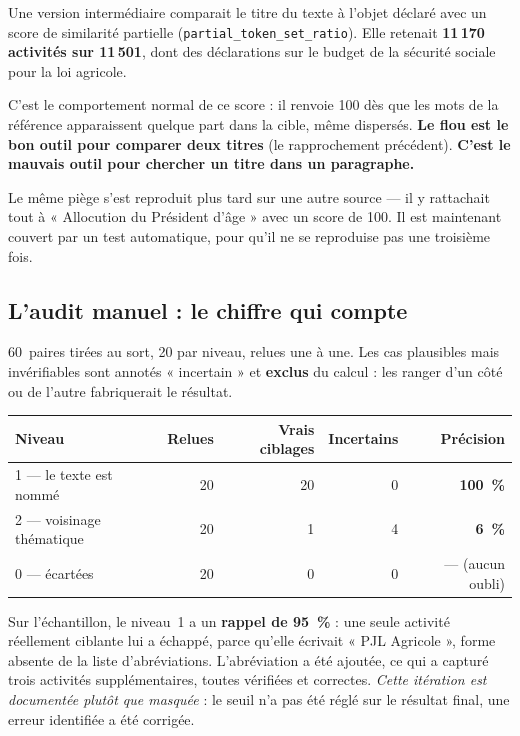 \documentclass[11pt,a4paper]{article}
\begin{document}
\begin{jargon}
Une version intermédiaire comparait le titre du texte à l'objet déclaré avec un score de
similarité partielle (\texttt{partial\_token\_set\_ratio}). Elle retenait
\textbf{11\,170 activités sur 11\,501}, dont des déclarations sur le budget de la sécurité
sociale pour la loi agricole.

C'est le comportement normal de ce score : il renvoie 100 dès que les mots de la référence
apparaissent quelque part dans la cible, même dispersés. \textbf{Le flou est le bon outil
pour comparer deux titres} (le rapprochement précédent). \textbf{C'est le mauvais outil
pour chercher un titre dans un paragraphe.}

Le même piège s'est reproduit plus tard sur une autre source --- il y rattachait tout à
« Allocution du Président d'âge » avec un score de 100. Il est maintenant couvert par un
test automatique, pour qu'il ne se reproduise pas une troisième fois.
\end{jargon}

\subsection{L'audit manuel : le chiffre qui compte}

60~paires tirées au sort, 20 par niveau, relues une à une. Les cas plausibles mais
invérifiables sont annotés « incertain » et \textbf{exclus} du calcul : les ranger d'un
côté ou de l'autre fabriquerait le résultat.

\begin{center}
\small
\begin{tabular}{@{}lrrrr@{}}
\toprule
\textbf{Niveau} & \textbf{Relues} & \textbf{Vrais ciblages} & \textbf{Incertains} & \textbf{Précision} \\
\midrule
1 --- le texte est nommé & 20 & 20 & 0 & \textbf{100~\%} \\
2 --- voisinage thématique & 20 & 1 & 4 & \textbf{6~\%} \\
0 --- écartées & 20 & 0 & 0 & --- (aucun oubli) \\
\bottomrule
\end{tabular}
\end{center}

Sur l'échantillon, le niveau~1 a un \textbf{rappel de 95~\%} : une seule activité
réellement ciblante lui a échappé, parce qu'elle écrivait « PJL Agricole », forme absente
de la liste d'abréviations. L'abréviation a été ajoutée, ce qui a capturé trois activités
supplémentaires, toutes vérifiées et correctes. \emph{Cette itération est documentée plutôt
que masquée} : le seuil n'a pas été réglé sur le résultat final, une erreur identifiée a
été corrigée.
\end{document}
